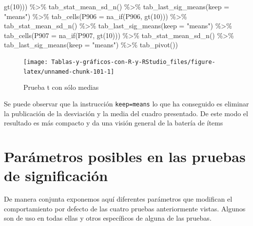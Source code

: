 \documentclass[
]{book}
\newenvironment{Shaded}{\begin{snugshade}}{\end{snugshade}}
\newcommand{\AttributeTok}[1]{\textcolor[rgb]{0.77,0.63,0.00}{#1}}
\newcommand{\DecValTok}[1]{\textcolor[rgb]{0.00,0.00,0.81}{#1}}
\newcommand{\FunctionTok}[1]{\textcolor[rgb]{0.00,0.00,0.00}{#1}}
\newcommand{\NormalTok}[1]{#1}
\newcommand{\SpecialCharTok}[1]{\textcolor[rgb]{0.00,0.00,0.00}{#1}}
\newcommand{\StringTok}[1]{\textcolor[rgb]{0.31,0.60,0.02}{#1}}
\begin{document}
\begin{Shaded}
\begin{Highlighting}[]
  \FunctionTok{gt}\NormalTok{(}\DecValTok{10}\NormalTok{))) }\SpecialCharTok{\%\textgreater{}\%} \FunctionTok{tab\_stat\_mean\_sd\_n}\NormalTok{() }\SpecialCharTok{\%\textgreater{}\%} \FunctionTok{tab\_last\_sig\_means}\NormalTok{(}\AttributeTok{keep =} \StringTok{"means"}\NormalTok{) }\SpecialCharTok{\%\textgreater{}\%} 
  \FunctionTok{tab\_cells}\NormalTok{(}\AttributeTok{P906 =} \FunctionTok{na\_if}\NormalTok{(P906, }\FunctionTok{gt}\NormalTok{(}\DecValTok{10}\NormalTok{))) }\SpecialCharTok{\%\textgreater{}\%} \FunctionTok{tab\_stat\_mean\_sd\_n}\NormalTok{() }\SpecialCharTok{\%\textgreater{}\%} 
  \FunctionTok{tab\_last\_sig\_means}\NormalTok{(}\AttributeTok{keep =} \StringTok{"means"}\NormalTok{) }\SpecialCharTok{\%\textgreater{}\%} \FunctionTok{tab\_cells}\NormalTok{(}\AttributeTok{P907 =} \FunctionTok{na\_if}\NormalTok{(P907, }
  \FunctionTok{gt}\NormalTok{(}\DecValTok{10}\NormalTok{))) }\SpecialCharTok{\%\textgreater{}\%} \FunctionTok{tab\_stat\_mean\_sd\_n}\NormalTok{() }\SpecialCharTok{\%\textgreater{}\%} \FunctionTok{tab\_last\_sig\_means}\NormalTok{(}\AttributeTok{keep =} \StringTok{"means"}\NormalTok{) }\SpecialCharTok{\%\textgreater{}\%} 
  \FunctionTok{tab\_pivot}\NormalTok{())}
\end{Highlighting}
\end{Shaded}

\begin{figure}[H]

{\centering \texttt{[image: Tablas-y-gráficos-con-R-y-RStudio\_files/figure-latex/unnamed-chunk-101-1]} 

}

\caption{Prueba t con sólo medias}\label{fig:unnamed-chunk-101}
\end{figure}

Se puede observar que la instrucción \texttt{keep=\textquotesingle{}means\textquotesingle{}} lo que ha conseguido es eliminar la publicación de la desviación y la media del cuadro presentado. De este modo el resultado es más compacto y da una visión general de la batería de ítems

\hypertarget{paruxe1metros-posibles-en-las-pruebas-de-significaciuxf3n}{%
\section{Parámetros posibles en las pruebas de significación}\label{paruxe1metros-posibles-en-las-pruebas-de-significaciuxf3n}}

De manera conjunta exponemos aquí diferentes parámetros que modifican el comportamiento por defecto de las cuatro pruebas anteriormente vistas. Algunos son de uso en todas ellas y otros específicos de alguna de las pruebas.
\end{document}
